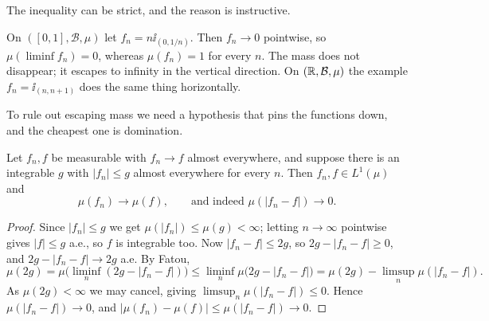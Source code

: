 \documentclass[a4paper]{scrartcl}
\newcommand{\cB}{\mathcal{B}}
\newcommand{\ind}{\ii}
\begin{document}
The inequality can be strict, and the reason is instructive.

\begin{example}\label{ex:bump}
	On $([0,1],\cB,\mu)$ let $f_n = n\ind_{(0,1/n)}$. Then $f_n \to 0$ pointwise, so $\mu(\liminf f_n) = 0$, whereas $\mu(f_n) = 1$ for every $n$. The mass does not disappear; it escapes to infinity in the vertical direction. On $(\R,\cB,\mu)$ the example $f_n = \ind_{(n,n+1)}$ does the same thing horizontally.
\end{example}

\begin{center}
\end{center}

To rule out escaping mass we need a hypothesis that pins the functions down, and the cheapest one is domination.

\begin{theorem}\label{thm:dct}
	Let $f_n, f$ be measurable with $f_n \to f$ almost everywhere, and suppose there is an integrable $g$ with $|f_n| \leq g$ almost everywhere for every $n$. Then $f_n, f \in L^1(\mu)$ and
	$$
	\mu(f_n) \to \mu(f), \qquad \text{and indeed } \mu(|f_n - f|) \to 0.
	$$
\end{theorem}
\begin{proof}
	Since $|f_n| \leq g$ we get $\mu(|f_n|)\leq \mu(g) < \infty$; letting $n\to\infty$ pointwise gives $|f| \leq g$ a.e., so $f$ is integrable too. Now $|f_n - f| \leq 2g$, so $2g - |f_n - f| \geq 0$, and $2g - |f_n-f| \to 2g$ a.e. By Fatou,
	$$
	\mu(2g) = \mu\big(\liminf_n (2g - |f_n - f|)\big) \leq \liminf_n \mu\big(2g - |f_n-f|\big) = \mu(2g) - \limsup_n \mu(|f_n-f|).
	$$
	As $\mu(2g) < \infty$ we may cancel, giving $\limsup_n \mu(|f_n-f|) \leq 0$. Hence $\mu(|f_n - f|)\to 0$, and $|\mu(f_n)-\mu(f)| \leq \mu(|f_n-f|) \to 0$.
\end{proof}
\end{document}

